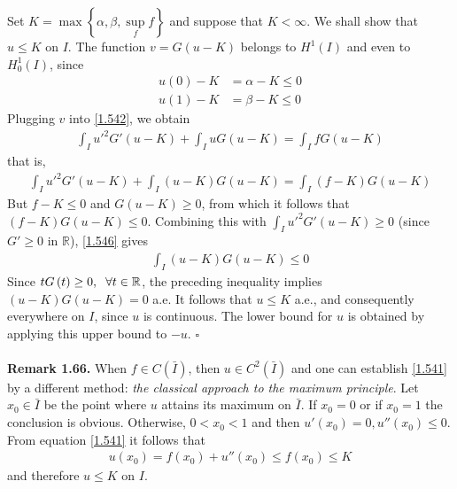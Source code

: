 \documentclass[a4paper,oneside]{book}
\numberwithin{equation}{chapter}
\begin{document}
Set $K = \max \left\{ {\alpha ,\beta ,\mathop {\sup }\limits_f f} \right\}$ and suppose that $K<\infty$. We shall show that $u\le K$ on $I$. The function $v=G\left(u-K\right)$ belongs to $H^1\left(I\right)$ and even to $H_0^1\left(I\right)$, since
\begin{align}
u\left( 0 \right) - K &= \alpha  - K \le 0\\
u\left( 1 \right) - K &= \beta  - K \le 0
\end{align}
Plugging $v$ into \eqref{1.542}, we obtain
\begin{align}
\int_I {u{'^2}G'\left( {u - K} \right)}  + \int_I {uG\left( {u - K} \right)}  = \int_I {fG\left( {u - K} \right)} 
\end{align}
that is,
\begin{align}
\label{1.546}
\int_I {u{'^2}G'\left( {u - K} \right)}  + \int_I {\left( {u - K} \right)G\left( {u - K} \right)}  = \int_I {\left( {f - K} \right)G\left( {u - K} \right)} 
\end{align}
But $f-K\le 0$ and $G\left(u-K\right) \ge 0$, from which it follows that $\left( {f - K} \right)G\left( {u - K} \right) \le 0$. Combining this with $\int_I {u{'^2}G'\left( {u - K} \right)}  \ge 0$ (since $G' \ge 0$ in $\mathbb{R}$), \eqref{1.546} gives
\begin{align}
\int_I {\left( {u - K} \right)G\left( {u - K} \right)}  \le 0
\end{align}
Since $tG\left(t\right)\ge 0,\hspace{0.2cm}\forall t\in \mathbb{R}$, the preceding inequality implies $\left( {u - K} \right)G\left( {u - K} \right) = 0$ a.e. It follows that $u\le K$ a.e., and consequently everywhere on $I$, since $u$ is continuous. The lower bound for $u$ is obtained by applying this upper bound to $-u$. \hfill $\square$\\
\\
\textbf{Remark 1.66.} When $f\in C\left(\bar I\right)$, then $u\in C^2\left(\bar I\right)$ and one can establish \eqref{1.541} by a different method: \textit{the classical approach to the maximum principle}. Let $x_0\in \bar I$ be the point where $u$ attains its maximum on $\bar I$. If $x_0=0$ or if $x_0=1$ the conclusion is obvious. Otherwise, $0<x_0<1$ and then $u'\left(x_0\right)=0,u''\left(x_0\right)\le 0$. From equation \eqref{1.541} it follows that
\begin{align}
u\left( {{x_0}} \right) = f\left( {{x_0}} \right) + u''\left( {{x_0}} \right) \le f\left( {{x_0}} \right) \le K
\end{align}
and therefore $u\le K$ on $I$.\\
\end{document}
